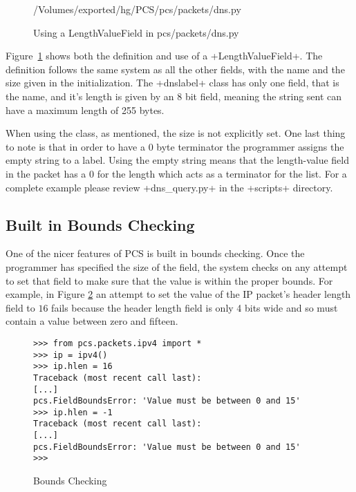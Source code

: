 \documentclass[11pt]{article}
\begin{document}
\begin{figure}
  \centering
{/Volumes/exported/hg/PCS/pcs/packets/dns.py}
  \caption{Using a LengthValueField in pcs/packets/dns.py}
  \label{fig:using-a-length-value-field}
\end{figure}

Figure~\ref{fig:using-a-length-value-field} shows both the definition
and use of a \class+LengthValueField+.  The definition follows the
same system as all the other fields, with the name and the size given
in the initialization.  The \class+dnslabel+ class has only one field,
that is the name, and it's length is given by an 8 bit field, meaning
the string sent can have a maximum length of 255 bytes.  

When using the class, as mentioned, the size is not explicitly set.
One last thing to note is that in order to have a 0 byte terminator
the programmer assigns the empty string to a label.  Using the empty
string means that the length-value field in the packet has a 0 for the
length which acts as a terminator for the list.  For a complete
example please review \file+dns\_query.py+ in the \file+scripts+
directory.

\subsection{Built in Bounds Checking}
\label{sec:built-in-bounds-checking}

One of the nicer features of PCS is built in bounds checking.  Once
the programmer has specified the size of the field, the system checks
on any attempt to set that field to make sure that the value is within
the proper bounds.  For example, in Figure \ref{fig:bounds-checking-1}
an attempt to set the value of the IP packet's header length field to
$16$ fails because the header length field is only 4 bits wide and so
must contain a value between zero and fifteen.

\begin{figure}
  \centering
\begin{lstlisting}
>>> from pcs.packets.ipv4 import *
>>> ip = ipv4()
>>> ip.hlen = 16
Traceback (most recent call last):
[...]
pcs.FieldBoundsError: 'Value must be between 0 and 15'
>>> ip.hlen = -1
Traceback (most recent call last):
[...]
pcs.FieldBoundsError: 'Value must be between 0 and 15'
>>> 
\end{lstlisting}
  \caption{Bounds Checking}
  \label{fig:bounds-checking-1}
\end{figure}
\end{document}
